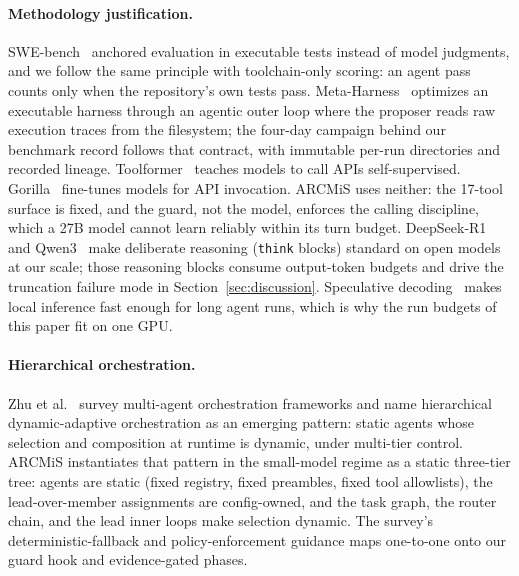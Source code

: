 \documentclass[11pt]{article}
\begin{document}
\paragraph{Methodology justification.}
SWE-bench~\cite{jimenez2024swebench} anchored evaluation in executable
tests instead of model judgments, and we follow the same principle with
toolchain-only scoring: an agent pass counts only when the repository's
own tests pass. Meta-Harness~\cite{metaharness2026} optimizes an executable harness
through an agentic outer loop where the proposer reads raw execution
traces from the filesystem; the four-day campaign behind our benchmark
record follows that contract, with immutable per-run directories and
recorded lineage. Toolformer~\cite{schick2023toolformer} teaches
models to call APIs self-supervised. Gorilla~\cite{patil2024gorilla}
fine-tunes models for API invocation. ARCMiS uses neither: the 17-tool
surface is fixed, and the guard, not the model, enforces the calling
discipline, which a 27B model cannot learn reliably within its turn
budget. DeepSeek-R1~\cite{deepseek2025r1}
and Qwen3~\cite{qwen3_2025} make deliberate reasoning (\texttt{think}
blocks) standard on open models at our scale; those reasoning blocks
consume output-token budgets and drive the truncation failure mode in
Section~\ref{sec:discussion}. Speculative
decoding~\cite{leviathan2023speculative} makes local inference fast
enough for long agent runs, which is why the run budgets of this paper
fit on one GPU.

\paragraph{Hierarchical orchestration.}
Zhu et al.~\cite{zhu2026orchestration} survey multi-agent orchestration
frameworks and name hierarchical dynamic-adaptive orchestration as an
emerging pattern: static agents whose selection and composition at
runtime is dynamic, under multi-tier control. ARCMiS instantiates that
pattern in the small-model regime as a static three-tier tree: agents
are static (fixed registry, fixed preambles, fixed tool allowlists), the
lead-over-member assignments are config-owned, and the task graph, the
router chain, and the lead inner loops make selection dynamic. The
survey's deterministic-fallback and policy-enforcement guidance maps
one-to-one onto our guard hook and evidence-gated phases.
\end{document}
